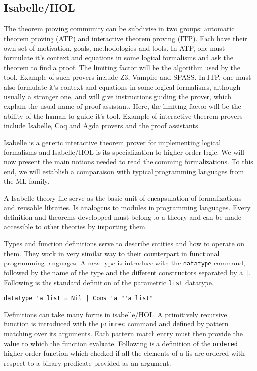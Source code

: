 \documentclass[a4paper, oneside, 12pt, titlepage]{article}
\begin{document}
\subsection{Isabelle/HOL}

The theorem proving community can be subdivise in two groups: automatic theorem proving (ATP) and
interactive theorem proving (ITP). Each have their own set of motivation, goals, methodologies and
tools. In ATP, one must formulate it's context and equations in some logical formalisms and ask the
theorem to find a proof. The limiting factor will be the algorithm used by the tool. Example of such
provers include Z3, Vampire and SPASS. In ITP, one must also formulate it's context and equations in
some logical formalisms, although usually a stronger one, and will give instructions guiding the
prover, which explain the usual name of proof assistant. Here, the limiting factor will be the
ability of the human to guide it's tool. Example of interactive theorem provers include Isabelle,
Coq and Agda provers and the proof assistants.

Isabelle is a generic interactive theorem prover for implementing logical formalisms and
Isabelle/HOL is its specialization to higher order logic. We will now present the main notions
needed to read the comming formalizations. To this end, we will establish a comparaison with typical
programming languages from the ML family.

A Isabelle theory file serve as the basic unit of encapsulation of formalizations and reusable
libraries. Is analogous to modules in programming languages. Every definition and theorems
developped must belong to a theory and can be made accessible to other theories by importing them.

Types and function definitions serve to describe entities and how to operate on them. They work in
very similar way to their counterpart in functional programming languages. A new type is introduce
with the \texttt{datatype} command, followed by the name of the type and the different constructors
separated by a \texttt{|}. Following is the standard definition of the parametric \texttt{list}
datatype.

\begin{verbatim}
datatype 'a list = Nil | Cons 'a "'a list"
\end{verbatim}

Definitions can take many forms in isabelle/HOL. A primitively recursive function is introduced with
the \texttt{primrec} command and defined by pattern matching over its arguments. Each pattern match
entry must then provide the value to which the function evaluate. Following is a definition of the
\texttt{ordered} higher order function which checked if all the elements of a lis are ordered with
respect to a binary predicate provided as an argument.
\end{document}
